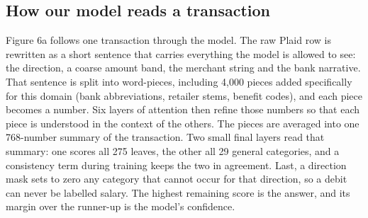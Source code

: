 \subsection{How our model reads a transaction}
Figure 6a follows one transaction through the model. The raw Plaid row is rewritten as a short sentence that carries everything the model is allowed to see: the direction, a coarse amount band, the merchant string and the bank narrative. That sentence is split into word-pieces, including 4,000 pieces added specifically for this domain (bank abbreviations, retailer stems, benefit codes), and each piece becomes a number. Six layers of attention then refine those numbers so that each piece is understood in the context of the others. The pieces are averaged into one 768-number summary of the transaction. Two small final layers read that summary: one scores all 275 leaves, the other all 29 general categories, and a consistency term during training keeps the two in agreement. Last, a direction mask sets to zero any category that cannot occur for that direction, so a debit can never be labelled salary. The highest remaining score is the answer, and its margin over the runner-up is the model's confidence.

